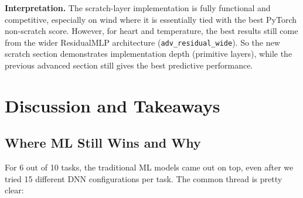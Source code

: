 \documentclass[11pt,a4paper]{article}
\begin{document}
\begin{center}
\end{center}

\textbf{Interpretation.}
The scratch-layer implementation is fully functional and competitive, especially on wind where it is essentially tied with the best PyTorch non-scratch score.
However, for heart and temperature, the best results still come from the wider ResidualMLP architecture (\texttt{adv\_residual\_wide}).
So the new scratch section demonstrates implementation depth (primitive layers), while the previous advanced section still gives the best predictive performance.

\section{Discussion and Takeaways}

\subsection{Where ML Still Wins and Why}

For 6 out of 10 tasks, the traditional ML models came out on top, even after we tried 15 different DNN configurations per task. The common thread is pretty clear:
\end{document}
